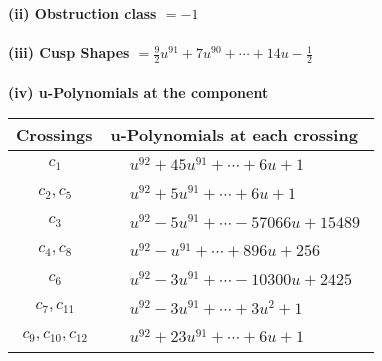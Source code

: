 \documentclass[1p]{elsarticle_modified}
\theoremstyle{definition}
\begin{document}
\flushleft \textbf{(ii) Obstruction class $= -1$}\\~\\
\flushleft \textbf{(iii) Cusp Shapes $= \frac{9}{2} u^{91}+7 u^{90}+\cdots+14 u-\frac{1}{2}$}\\~\\
\newpage\renewcommand{\arraystretch}{1}
\flushleft \textbf{(iv) u-Polynomials at the component}\newline \\
\begin{tabular}{m{50pt}|m{274pt}}
Crossings & \hspace{64pt}u-Polynomials at each crossing \\
\hline $$\begin{aligned}c_{1}\end{aligned}$$&$\begin{aligned}
&u^{92}+45 u^{91}+\cdots+6 u+1
\end{aligned}$\\
\hline $$\begin{aligned}c_{2},c_{5}\end{aligned}$$&$\begin{aligned}
&u^{92}+5 u^{91}+\cdots+6 u+1
\end{aligned}$\\
\hline $$\begin{aligned}c_{3}\end{aligned}$$&$\begin{aligned}
&u^{92}-5 u^{91}+\cdots-57066 u+15489
\end{aligned}$\\
\hline $$\begin{aligned}c_{4},c_{8}\end{aligned}$$&$\begin{aligned}
&u^{92}- u^{91}+\cdots+896 u+256
\end{aligned}$\\
\hline $$\begin{aligned}c_{6}\end{aligned}$$&$\begin{aligned}
&u^{92}-3 u^{91}+\cdots-10300 u+2425
\end{aligned}$\\
\hline $$\begin{aligned}c_{7},c_{11}\end{aligned}$$&$\begin{aligned}
&u^{92}-3 u^{91}+\cdots+3 u^2+1
\end{aligned}$\\
\hline $$\begin{aligned}c_{9},c_{10},c_{12}\end{aligned}$$&$\begin{aligned}
&u^{92}+23 u^{91}+\cdots+6 u+1
\end{aligned}$\\
\hline
\end{tabular}\\~\\
\end{document}
